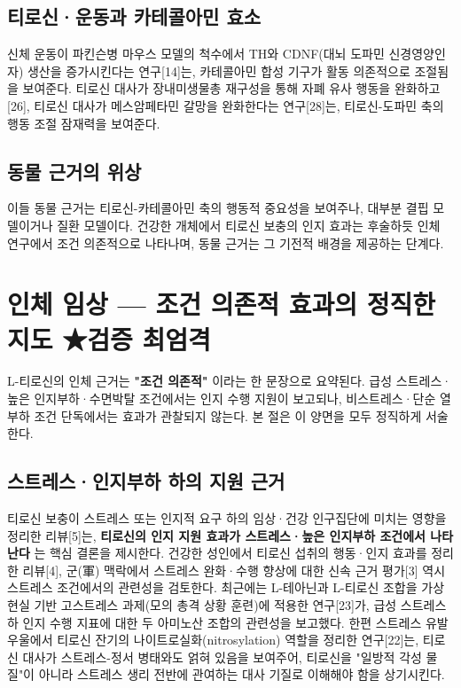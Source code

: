 \documentclass[11pt,oneside]{book}
\begin{document}
\subsection{티로신·운동과 카테콜아민 효소}
신체 운동이 파킨슨병 마우스 모델의 척수에서 TH와 CDNF(대뇌 도파민 신경영양인자) 생산을 증가시킨다는 연구[14]는, 카테콜아민 합성 기구가 활동 의존적으로 조절됨을 보여준다. 티로신 대사가 장내미생물총 재구성을 통해 자폐 유사 행동을 완화하고[26], 티로신 대사가 메스암페타민 갈망을 완화한다는 연구[28]는, 티로신-도파민 축의 행동 조절 잠재력을 보여준다.

\subsection{동물 근거의 위상}
이들 동물 근거는 티로신-카테콜아민 축의 행동적 중요성을 보여주나, 대부분 결핍 모델이거나 질환 모델이다. 건강한 개체에서 티로신 보충의 인지 효과는 후술하듯 인체 연구에서 조건 의존적으로 나타나며, 동물 근거는 그 기전적 배경을 제공하는 단계다.

\section{인체 임상 — 조건 의존적 효과의 정직한 지도 ★검증 최엄격}
L-티로신의 인체 근거는 \textbf{"조건 의존적"} 이라는 한 문장으로 요약된다. 급성 스트레스·높은 인지부하·수면박탈 조건에서는 인지 수행 지원이 보고되나, 비스트레스·단순 열부하 조건 단독에서는 효과가 관찰되지 않는다. 본 절은 이 양면을 모두 정직하게 서술한다.

\subsection{스트레스·인지부하 하의 지원 근거}
티로신 보충이 스트레스 또는 인지적 요구 하의 임상·건강 인구집단에 미치는 영향을 정리한 리뷰[5]는, \textbf{티로신의 인지 지원 효과가 스트레스·높은 인지부하 조건에서 나타난다} 는 핵심 결론을 제시한다. 건강한 성인에서 티로신 섭취의 행동·인지 효과를 정리한 리뷰[4], 군(軍) 맥락에서 스트레스 완화·수행 향상에 대한 신속 근거 평가[3] 역시 스트레스 조건에서의 관련성을 검토한다. 최근에는 L-테아닌과 L-티로신 조합을 가상현실 기반 고스트레스 과제(모의 총격 상황 훈련)에 적용한 연구[23]가, 급성 스트레스 하 인지 수행 지표에 대한 두 아미노산 조합의 관련성을 보고했다. 한편 스트레스 유발 우울에서 티로신 잔기의 나이트로실화(nitrosylation) 역할을 정리한 연구[22]는, 티로신 대사가 스트레스-정서 병태와도 얽혀 있음을 보여주어, 티로신을 "일방적 각성 물질"이 아니라 스트레스 생리 전반에 관여하는 대사 기질로 이해해야 함을 상기시킨다.
\end{document}
